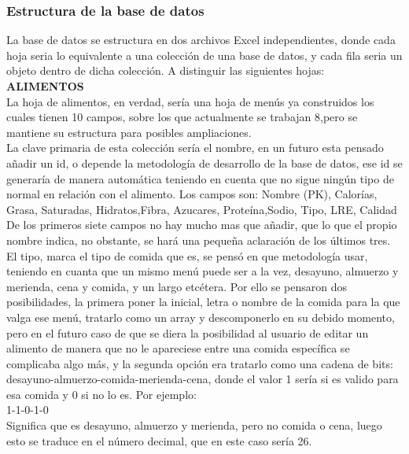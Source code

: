 \subsubsection{Estructura de la base de datos}
La base de datos se estructura en dos archivos Excel independientes, donde cada hoja seria lo equivalente a una colección de una base de datos, y cada fila seria un objeto dentro de dicha colección. A distinguir las siguientes hojas:\\

\textbf{\textsc{ALIMENTOS}}\\
La hoja de alimentos, en verdad, sería una hoja de menús ya construidos los cuales tienen 10 campos, sobre los que actualmente se trabajan 8,pero se mantiene su estructura para posibles ampliaciones.\\

La clave primaria de esta colección sería el nombre, en un futuro esta pensado añadir un id, o depende la metodología de desarrollo de la base de datos, ese id se generaría de manera automática teniendo en cuenta que no sigue ningún tipo de normal en relación con el alimento.
Los campos son:
Nombre (PK), Calorías, Grasa, Saturadas, Hidratos,Fibra, Azucares, Proteína,Sodio, Tipo, LRE, Calidad
De los primeros siete campos no hay mucho mas que añadir, que lo que el propio nombre indica, no obstante, se hará una pequeña aclaración de los últimos tres.\\

El tipo, marca el tipo de comida que es, se pensó en que metodología usar, teniendo en cuanta que un mismo menú puede ser a la vez, desayuno, almuerzo y merienda, cena y comida, y un largo etcétera. Por ello se pensaron dos posibilidades, la primera poner la inicial, letra o nombre de la comida para la que valga ese menú, tratarlo como un array y descomponerlo en su debido momento, pero en el futuro caso de que se diera la posibilidad al usuario de editar un alimento de manera que no le apareciese entre una comida específica se complicaba algo más, y la segunda opción era tratarlo como una cadena de bits: desayuno-almuerzo-comida-merienda-cena, donde el valor 1 sería si es valido para esa comida y 0 si no lo es. Por ejemplo:\\
1-1-0-1-0 \\

Significa que es desayuno, almuerzo y merienda, pero no comida o cena, luego esto se traduce en el número decimal, que en este caso sería 26.\\

